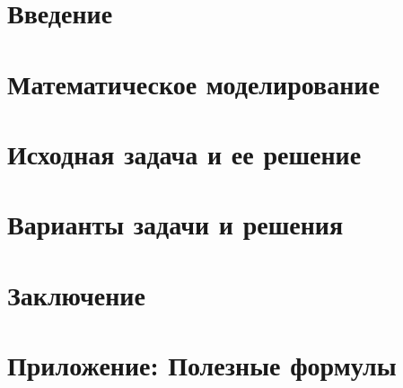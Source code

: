 \documentclass{report}%
\renewcommand{\headrulewidth}{0.4pt}
\begin{document}


\tableofcontents


\fancyhf{} %
\renewcommand{\headrulewidth}{0pt} %
\rfoot{\small \thepage}
\pagestyle{fancy}

\setcounter{page}{2}
\chapter{Введение}


\chapter{Математическое моделирование }


\chapter{Исходная задача и ее решение}


\chapter{Варианты задачи и решения}


\chapter{Заключение}


\appendix
\chapter{Приложение: Полезные формулы}


\printbibliography
\end{document}
